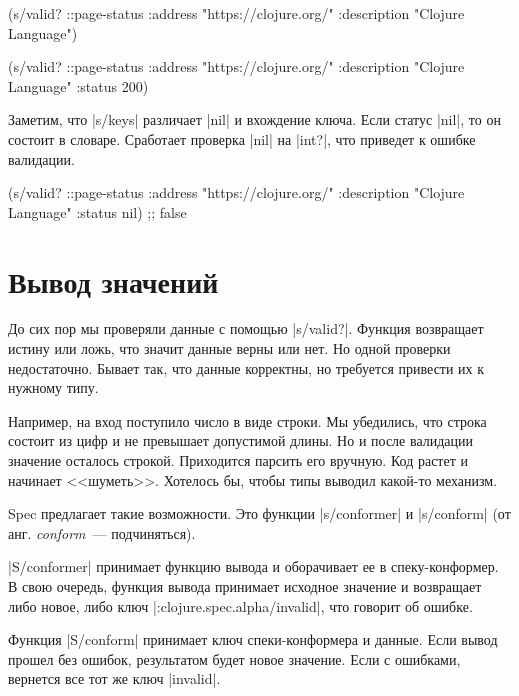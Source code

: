 \begin{english}
  \begin{clojure}
(s/valid? ::page-status
          {:address "https://clojure.org/"
           :description "Clojure Language"})

(s/valid? ::page-status
          {:address "https://clojure.org/"
           :description "Clojure Language"
           :status 200})
  \end{clojure}
\end{english}

Заметим, что \spverb|s/keys| различает \spverb|nil| и вхождение ключа. Если
статус \spverb|nil|, то он состоит в словаре. Сработает проверка \spverb|nil| на
\spverb|int?|, что приведет к ошибке валидации.

\begin{english}
  \begin{clojure}
(s/valid? ::page-status
          {:address "https://clojure.org/"
           :description "Clojure Language"
           :status nil})
;; false
  \end{clojure}
\end{english}

\section{Вывод значений}

\label{spec-conform}

До сих пор мы проверяли данные с помощью \spverb|s/valid?|. Функция возвращает
истину или ложь, что значит данные верны или нет. Но одной проверки
недостаточно. Бывает так, что данные корректны, но требуется привести их к
нужному типу.

Например, на вход поступило число в виде строки. Мы убедились, что строка
состоит из цифр и не превышает допустимой длины. Но и после валидации значение
осталось строкой. Приходится парсить его вручную. Код растет и начинает
<<шуметь>>. Хотелось бы, чтобы типы выводил какой-то механизм.

Spec предлагает такие возможности. Это функции \spverb|s/conformer| и
\spverb|s/conform| (от анг. \emph{conform}~--- подчиняться).

\spverb|S/conformer| принимает функцию вывода и оборачивает ее в
спеку-конформер. В свою очередь, функция вывода принимает исходное значение и
возвращает либо новое, либо ключ \spverb|:clojure.spec.alpha/invalid|, что
говорит об ошибке.

Функция \spverb|S/conform| принимает ключ спеки-конформера и данные. Если вывод
прошел без ошибок, результатом будет новое значение. Если с ошибками, вернется
все тот же ключ \spverb|invalid|.

